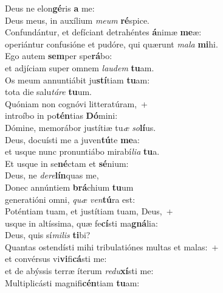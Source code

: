 \oddverse Deus ne elon\textbf{gé}ris \textbf{a} me:~\*\\
\oddverse Deus meus, in auxílium \textit{me}\textit{um} \textbf{ré}spice.\\
\evenverse Confundántur, et defíciant detrahéntes \textbf{á}nimæ \textbf{me}æ:~\*\\
\evenverse operiántur confusióne et pudóre, qui quærunt \textit{ma}\textit{la} \textbf{mi}hi.\\
\oddverse Ego autem \textbf{sem}per spe\textbf{rá}bo:~\*\\
\oddverse et adjíciam super omnem \textit{lau}\textit{dem} \textbf{tu}am.\\
\evenverse Os meum annuntiábit ju\textbf{stí}tiam \textbf{tu}am:~\*\\
\evenverse tota die salu\textit{tá}\textit{re} \textbf{tu}um.\\
\oddverse Quóniam non cognóvi litteratúram,~+\\
\oddverse  introíbo in po\textbf{tén}tias \textbf{Dó}mini:~\*\\
\oddverse Dómine, memorábor justítiæ tu\textit{æ} \textit{so}\textbf{lí}us.\\
\evenverse Deus, docuísti me a juven\textbf{tú}te \textbf{me}a:~\*\\
\evenverse et usque nunc pronuntiábo mirabí\textit{li}\textit{a} \textbf{tu}a.\\
\oddverse Et usque in se\textbf{né}ctam et \textbf{sé}nium:~\*\\
\oddverse Deus, ne \textit{de}\textit{re}\textbf{lín}quas me,\\
\evenverse Donec annúntiem \textbf{brá}chium \textbf{tu}um~\*\\
\evenverse generatióni omni, \textit{quæ} \textit{ven}\textbf{tú}ra est:\\
\oddverse Poténtiam tuam, et justítiam tuam, Deus,~+\\
\oddverse  usque in altíssima, quæ fe\textbf{cí}sti ma\textbf{gná}lia:~\*\\
\oddverse Deus, quis sí\textit{mi}\textit{lis} \textbf{ti}bi?\\
\evenverse Quantas ostendísti mihi tribulatiónes multas et malas:~+\\
\evenverse  et convérsus vi\textbf{vi}fi\textbf{cá}sti me:~\*\\
\evenverse et de abýssis terræ íterum \textit{re}\textit{du}\textbf{xí}sti me:\\
\oddverse Multiplicásti magnifi\textbf{cén}tiam \textbf{tu}am:~\*\\
